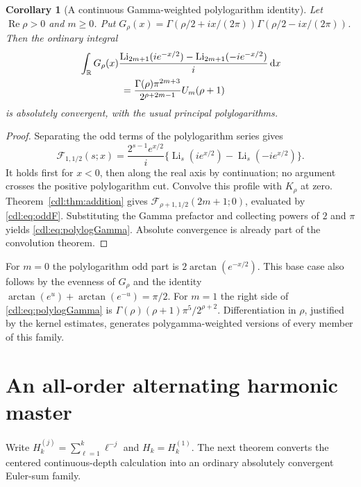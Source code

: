 \documentclass[11pt,letterpaper]{article}
\numberwithin{equation}{section}
\newtheorem{corollary}[theorem]{Corollary}
\theoremstyle{definition}\newtheorem{definition}[theorem]{Definition}
\theoremstyle{remark}\newtheorem{remark}[theorem]{Remark}
\newcommand{\Rea}{\operatorname{Re}}\newcommand{\Ima}{\operatorname{Im}}
\newcommand{\Li}{\operatorname{Li}}\newcommand{\dd}{\,\mathrm d}
\newcommand{\F}{\mathcal F}\newcommand{\E}{\mathcal E}
\begin{document}
\begin{corollary}[A continuous Gamma-weighted polylogarithm identity]
\label{cdl:cor:polylog}
Let $\Rea\rho>0$ and $m\ge0$. Put
$G_\rho(x)=\Gamma(\rho/2+ix/(2\pi))\Gamma(\rho/2-ix/(2\pi))$.
Then the ordinary integral
\begin{equation}\label{cdl:eq:polylogGamma}
 \begin{split}
 &\int_\R G_\rho(x)
 \frac{\Li_{2m+1}(ie^{-x/2})-\Li_{2m+1}(-ie^{-x/2})}{i}\dd x\\
 &\hspace{15mm}=
 \frac{\Gamma(\rho)\pi^{2m+3}}{2^{\rho+2m-1}}U_m(\rho+1)
 \end{split}
\end{equation}
is absolutely convergent, with the usual principal polylogarithms.
\end{corollary}
\begin{proof}
Separating the odd terms of the polylogarithm series gives
\[
 \F_{1,1/2}(s;x)=\frac{2^{s-1}e^{x/2}}i
 \{\Li_s(ie^{x/2})-\Li_s(-ie^{x/2})\}.
\]
It holds first for $x<0$, then along the real axis by continuation;
no argument crosses the positive polylogarithm cut. Convolve this
profile with $K_\rho$ at zero. Theorem~\ref{cdl:thm:addition}
gives $\F_{\rho+1,1/2}(2m+1;0)$, evaluated by
\eqref{cdl:eq:oddF}. Substituting the Gamma prefactor and collecting
powers of $2$ and $\pi$ yields \eqref{cdl:eq:polylogGamma}.
Absolute convergence is already part of the convolution theorem.
\end{proof}

For $m=0$ the polylogarithm odd part is
$2\arctan(e^{-x/2})$. This base case also follows by the evenness of
$G_\rho$ and the identity
$\arctan(e^u)+\arctan(e^{-u})=\pi/2$.
For $m=1$ the right side of \eqref{cdl:eq:polylogGamma} is
$\Gamma(\rho)(\rho+1)\pi^5/2^{\rho+2}$.
Differentiation in $\rho$, justified by the kernel estimates, generates
polygamma-weighted versions of every member of this family.

\section{An all-order alternating harmonic master}
\label{cdl:sec:harmonic}

Write $H_k^{(j)}=\sum_{\ell=1}^k\ell^{-j}$ and $H_k=H_k^{(1)}$.
The next theorem converts the centered continuous-depth calculation
into an ordinary absolutely convergent Euler-sum family.
\end{document}
